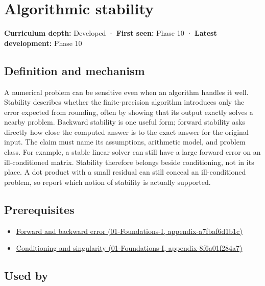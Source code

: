 \hypertarget{appendix-aa2bf0d79639}{}
\section{Algorithmic stability}\label{appendix-aa2bf0d79639-algorithmic-stability}

\textbf{Curriculum depth:} Developed · \textbf{First seen:} Phase 10 · \textbf{Latest development:} Phase 10

\subsection{Definition and mechanism}\label{appendix-aa2bf0d79639-definition-and-mechanism}

A numerical problem can be sensitive even when an algorithm handles it well. Stability describes whether the finite-precision algorithm introduces only the error expected from rounding, often by showing that its output exactly solves a nearby problem. Backward stability is one useful form; forward stability asks directly how close the computed answer is to the exact answer for the original input. The claim must name its assumptions, arithmetic model, and problem class. For example, a stable linear solver can still have a large forward error on an ill-conditioned matrix. Stability therefore belongs beside conditioning, not in its place. A dot product with a small residual can still conceal an ill-conditioned problem, so report which notion of stability is actually supported.

\subsection{Prerequisites}\label{appendix-aa2bf0d79639-prerequisites}

\begin{itemize}
\tightlist
\item
  \href{../01-Foundations-I/main.pdf\#nameddest=appendix-a7fbaf6d1b1c}{Forward and backward error (01-Foundations-I, appendix-a7fbaf6d1b1c)}
\item
  \href{../01-Foundations-I/main.pdf\#nameddest=appendix-8f6a01f284a7}{Conditioning and singularity (01-Foundations-I, appendix-8f6a01f284a7)}
\end{itemize}

\subsection{Used by}\label{appendix-aa2bf0d79639-used-by}

